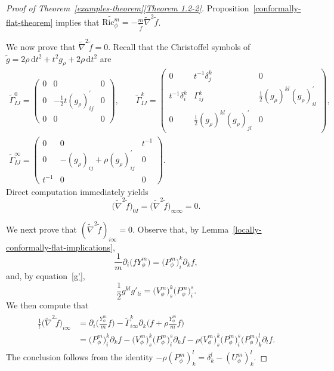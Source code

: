 \documentclass[10pt,a4paper]{amsart}
\numberwithin{equation}{section}
\begin{document}
\begin{proof}[Proof of Theorem~\ref{examples-theorem}\ref{Theorem 1.2-2}]
 Proposition~\ref{conformally-flat-theorem} implies that $\widetilde{\mathrm{Ric}_\phi^m}=-\frac{m}{\widetilde{f}}\widetilde{\nabla}^2 \widetilde{f}$.

We now prove that $\widetilde{\nabla}^2 \widetilde{f}=0$. Recall \cite[equation~(3.16)]{FeffermanGraham2012} that the Christoffel symbols of $\widetilde{g}=2\rho\, \mathrm{d}t^2+t^2 g_\rho+2\rho\, \mathrm{d}t^2$ are
\begin{gather}
\widetilde{\Gamma}_{I J}^{0}=\begin{pmatrix}
0 & 0 & 0 \\
0 & -\frac{1}{2} t (g_\rho)_{i j}^{\prime} & 0 \\
0 & 0 & 0
\end{pmatrix}\!, \qquad
\widetilde{\Gamma}_{I J}^{k}=\begin{pmatrix}
0 & t^{-1} \delta_{j}^{k} & 0 \\
t^{-1} \delta_{i}^{k} & \Gamma_{i j}^{k} & \frac{1}{2} (g_\rho)^{k l} (g_\rho)_{i l}^{\prime} \\
0 & \frac{1}{2} (g_\rho)^{k l} (g_\rho)_{j l}^{\prime} & 0
\end{pmatrix}\!, \nonumber
\\
\widetilde{\Gamma}_{I J}^{\infty}=\begin{pmatrix}
0 & 0 & t^{-1} \\
0 & -(g_\rho)_{i j}+\rho (g_\rho)_{i j}^{\prime} & 0 \\
t^{-1} & 0 & 0
\end{pmatrix}\!.
\label{christoffel-weighted-normal-straight}
\end{gather}
Direct computation immediately yields
\[
\big(\widetilde{\nabla}^2 \widetilde{f}\big)_{0 I}=\big(\widetilde{\nabla}^2 \widetilde{f}\big)_{\infty\infty}=0.
\]

We next prove that $(\widetilde{\nabla}^2\widetilde{f})_{i\infty}=0$. Observe that, by Lemma~\ref{locally-conformally-flat-implications},
\begin{equation}\label{fyphim}
\frac{1}{m}\partial_i \big(fY_\phi^m\big)=\big(P_\phi^m\big)_i^k \partial_k f,
\end{equation}
and, by equation~\eqref{g'},
\[
\frac{1}{2}g^{kl}g'_{li}=\big(V_\phi^m\big)^k_s \big(P_\phi^m\big)^s_i.
\]
We then compute that{\samepage
\begin{gather*}
\begin{split}
\frac{1}{t}\big(\widetilde{\nabla}^2 \widetilde{f}\big)_{i\infty}&=\partial_i \biggl(\frac{Y_\phi^m}{m}f\biggr)-\widetilde{\Gamma}_{i\infty}^k \partial_k\biggl(f+\rho \frac{Y_\phi^m}{m}f\biggr)\\
&=\big(P_\phi^m\big)^k_i \partial_k f-\big(V_\phi^m\big)^k_s\big(P_\phi^m\big)^s_i\partial_k f-\rho\big(V_\phi^m\big)^k_s \big(P_\phi^m\big)^s_i \big(P_\phi^m\big)^l_k \partial_l f.
\end{split}
\end{gather*}
The conclusion follows from the identity $-\rho (P_\phi^m)^l_k=\delta^l_k-(U_\phi^m)^l_k$.}


\end{proof}
\end{document}
